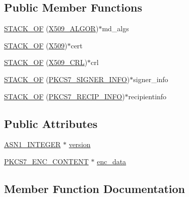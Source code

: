 \subsection*{Public Member Functions}
\begin{DoxyCompactItemize}
\item 
\hyperlink{structpkcs7__signedandenveloped__st_ac087476fa26a6ca86cc3a476a1fb1b08}{S\+T\+A\+C\+K\+\_\+\+OF} (\hyperlink{ossl__typ_8h_aa2b6185e6254f36f709cd6577fb5022e}{X509\+\_\+\+A\+L\+G\+OR})$\ast$md\+\_\+algs
\item 
\hyperlink{structpkcs7__signedandenveloped__st_a1da5d9733cf881dc6268a35e43468045}{S\+T\+A\+C\+K\+\_\+\+OF} (\hyperlink{ossl__typ_8h_a4f666bde6518f95deb3050c54b408416}{X509})$\ast$cert
\item 
\hyperlink{structpkcs7__signedandenveloped__st_a5fe37928a5d1d77475394498801e13ce}{S\+T\+A\+C\+K\+\_\+\+OF} (\hyperlink{ossl__typ_8h_ac8661d2485c2c8da5fd7dd26b846f4bf}{X509\+\_\+\+C\+RL})$\ast$crl
\item 
\hyperlink{structpkcs7__signedandenveloped__st_ace1e90a030d77ba8eb28e32eea02ef5c}{S\+T\+A\+C\+K\+\_\+\+OF} (\hyperlink{pkcs7_8h_a827824ab5bc7870ffbc5213959710815}{P\+K\+C\+S7\+\_\+\+S\+I\+G\+N\+E\+R\+\_\+\+I\+N\+FO})$\ast$signer\+\_\+info
\item 
\hyperlink{structpkcs7__signedandenveloped__st_a776fcc6d73b4a25d83e96faf6cb364c9}{S\+T\+A\+C\+K\+\_\+\+OF} (\hyperlink{pkcs7_8h_a8b0ed73366ea46f65dfaa11ae7882dad}{P\+K\+C\+S7\+\_\+\+R\+E\+C\+I\+P\+\_\+\+I\+N\+FO})$\ast$recipientinfo
\end{DoxyCompactItemize}
\subsection*{Public Attributes}
\begin{DoxyCompactItemize}
\item 
\hyperlink{ossl__typ_8h_af4335399bf9774cb410a5e93de65998b}{A\+S\+N1\+\_\+\+I\+N\+T\+E\+G\+ER} $\ast$ \hyperlink{structpkcs7__signedandenveloped__st_afa74cdf71197c1a7cdc53b1ee662802c}{version}
\item 
\hyperlink{pkcs7_8h_a4f2b044f01d16eb516f9027409e57d3a}{P\+K\+C\+S7\+\_\+\+E\+N\+C\+\_\+\+C\+O\+N\+T\+E\+NT} $\ast$ \hyperlink{structpkcs7__signedandenveloped__st_a13b7235eaaab4212ab646d69c10c8012}{enc\+\_\+data}
\end{DoxyCompactItemize}


\subsection{Member Function Documentation}

